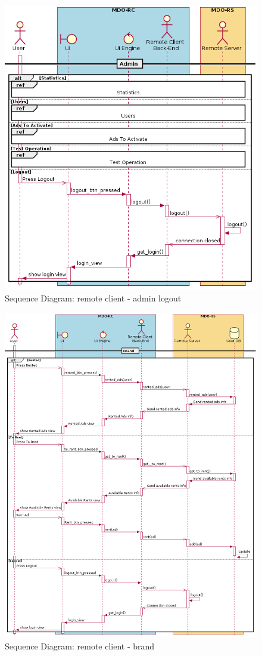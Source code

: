 \begin{figure}[htb!]
\centering
    \includegraphics[width=0.7\columnwidth]{./img/seq-rc-admin-logout.png}
  \caption{Sequence Diagram: remote client - admin logout}%
\label{fig:seq-rc-admin-logout}
\end{figure}

\begin{figure}[htb!]
\centering
    \includegraphics[width=0.9\columnwidth]{./img/seq-rc-brand.png}
  \caption{Sequence Diagram: remote client - brand}%
\label{fig:seq-rc-brand}
\end{figure}

